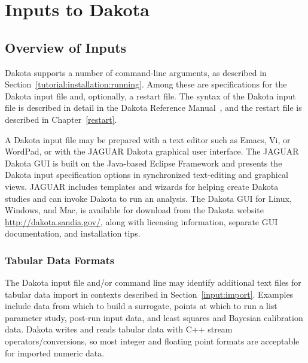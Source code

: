 \chapter{Inputs to Dakota}\label{input}

\section{Overview of Inputs}\label{input:overview}

Dakota supports a number of command-line arguments, as described in
Section~\ref{tutorial:installation:running}.  Among these are
specifications for the Dakota input file and, optionally, a restart
file.  The syntax of the Dakota input file is described in detail in
the Dakota Reference Manual~\cite{RefMan}, and the restart file is
described in Chapter~\ref{restart}.

A Dakota input file may be prepared with a text editor such as Emacs,
Vi, or WordPad, or with the JAGUAR Dakota graphical user interface.
The JAGUAR Dakota GUI is built on the Java-based Eclipse Framework
\cite{Eclipse} and presents the Dakota input specification options in
synchronized text-editing and graphical views.  JAGUAR includes
templates and wizards for helping create Dakota studies and can invoke
Dakota to run an analysis.  The Dakota GUI for Linux, Windows, and
Mac, is available for download from the Dakota website
\url{http://dakota.sandia.gov/}, along with licensing information,
separate GUI documentation, and installation tips.

\subsection{Tabular Data Formats}\label{input:tabularformat}

The Dakota input file and/or command line may identify additional text
files for tabular data import in contexts described in
Section~\ref{input:import}.  Examples include data from which to build
a surrogate, points at which to run a list parameter study, post-run
input data, and least squares and Bayesian calibration data. Dakota
writes and reads tabular data with C++ stream operators/conversions,
so most integer and floating point formats are acceptable for imported
numeric data.

